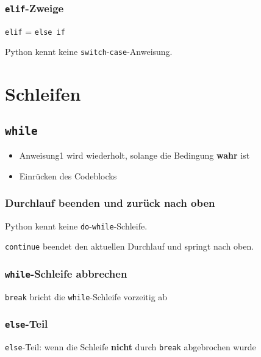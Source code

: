\subsubsection{\texttt{elif}-Zweige}

\texttt{elif} = \texttt{else if}\\

\begin{achtung}
	Python kennt keine \texttt{switch}-\texttt{case}-Anweisung.
\end{achtung}

\section{Schleifen}
\subsection{\texttt{while}}

\begin{itemize}
	\item Anweisung1 wird wiederholt, solange die Bedingung \textbf{wahr} ist
	\item Einrücken des Codeblocks
\end{itemize}

\subsubsection{Durchlauf beenden und zurück nach oben}
\begin{achtung}
	Python kennt keine \texttt{do}-\texttt{while}-Schleife.
\end{achtung}


\texttt{continue} beendet den aktuellen Durchlauf und springt nach oben.

\subsubsection{\texttt{while}-Schleife abbrechen}

\texttt{break} bricht die \texttt{while}-Schleife vorzeitig ab

\subsubsection{\texttt{else}-Teil}

\texttt{else}-Teil: wenn die Schleife \textbf{nicht} durch \texttt{break} abgebrochen wurde

